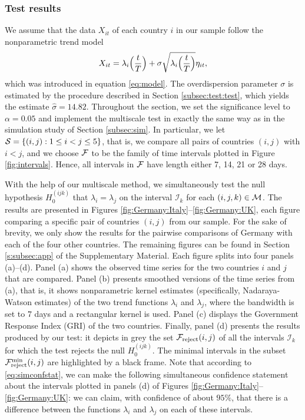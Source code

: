 \documentclass[a4paper,12pt]{article}
\numberwithin{equation}{section}
\begin{document}
\subsubsection{Test results}


We assume that the data $X_{it}$ of each country $i$ in our sample follow the nonparametric trend model 
\[ X_{it} = \lambda_i\Big(\frac{t}{T}\Big) + \sigma \sqrt{\lambda_i\Big(\frac{t}{T}\Big)} \eta_{it}, \]
which was introduced in equation \eqref{eq:model}. The overdispersion parameter $\sigma$ is estimated by the procedure described in Section \ref{subsec:test:test}, which yields the estimate $\hat{\sigma} = 14.82$. Throughout the section, we set the significance level to $\alpha=0.05$ and implement the multiscale test in exactly the same way as in the simulation study of Section \ref{subsec:sim}. In particular, we let $\mathcal{S} = \{ (i,j): 1 \le i < j \le 5\}$, that is, we compare all pairs of countries $(i,j)$ with $i < j$, and we choose $\mathcal{F}$ to be the family of time intervals plotted in Figure \ref{fig:intervals}. Hence, all intervals in $\mathcal{F}$ have length either 7, 14, 21 or 28 days. %


With the help of our multiscale method, we simultaneously test the null hypo\-thesis $H_0^{(ijk)}$ that $\lambda_i = \lambda_j$ on the interval $\mathcal{I}_k$ for each $(i, j, k) \in \mathcal{M}$. The results are presented in Figures \ref{fig:Germany:Italy}--\ref{fig:Germany:UK}, each figure comparing a specific pair of countries $(i,j)$ from our sample. For the sake of brevity, we only show the results for the pairwise comparisons of Germany with each of the four other countries. The remaining figures can be found in Section \ref{s:subsec:app} of the Supplementary Material. Each figure splits into four panels (a)--(d).  Panel (a) shows the observed time series for the two countries $i$ and $j$ that are compared. Panel (b) presents smoothed versions of the time series from (a), that is, it shows nonparametric kernel estimates (specifically, Nadaraya-Watson estimates) of the two trend functions $\lambda_i$ and $\lambda_j$, where the bandwidth is set to $7$ days and a rectangular kernel is used. Panel (c) displays the Government Response Index (GRI) of the two countries. Finally, panel (d) presents the results produced by our test: it depicts in grey the set $\mathcal{F}_{\text{reject}}(i,j)$ of all the intervals $\mathcal{I}_k$ for which the test rejects the null $H_0^{(ijk)}$. The minimal intervals in the subset $\mathcal{F}_{\text{reject}}^{\text{min}}(i, j)$ are highlighted by a black frame. Note that according to \eqref{eq:simconfstat}, we can make the following simultaneous confidence statement about the intervals plotted in panels (d) of Figures \ref{fig:Germany:Italy}--\ref{fig:Germany:UK}: we can claim, with confidence of about $95\%$, that there is a difference between the functions $\lambda_i$ and $\lambda_j$ on each of these intervals.
\end{document}
